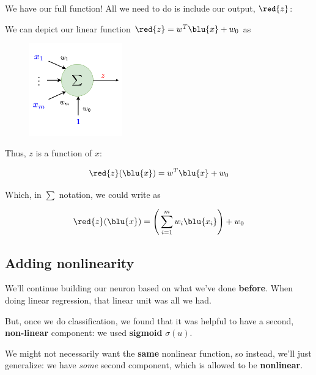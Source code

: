         We have our full function! All we need to do is include our output, $\red{z}$:\\
        
        \begin{notation}
            We can depict our linear function $\red{z} = w^T\blu{x}+w_0$ as
            \begin{figure}[H]
            \centering
            \includegraphics[width=40mm,scale=0.4]{images/nn_images/linear_subunit.png}
        \end{figure}
        \end{notation}
        
        Thus, $z$ is a function of $x$:
        
        \begin{equation}
            \red{z}(\blu{x}) = w^T\blu{x}+w_0
        \end{equation}
        
        Which, in $\sum$ notation, we could write as
        
        \begin{equation}
            \red{z}(\blu{x}) = \Bigg( \sum_{i=1}^m w_i\blu{x_i} \Bigg) +w_0
        \end{equation}
        
    \subsection{Adding nonlinearity}
    
        We'll continue building our neuron based on what we've done \textbf{before}. When doing linear regression, that linear unit was all we had. 
        
        But, once we do classification, we found that it was helpful to have a second, \textbf{non-linear} component: we used \textbf{sigmoid} $\sigma(u)$.
        
        We might not necessarily want the \textbf{same} nonlinear function, so instead, we'll just generalize: we have \textit{some} second component, which is allowed to be \textbf{nonlinear}.
        

